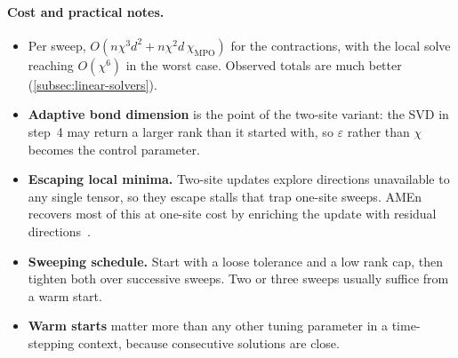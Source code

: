 \paragraph{Cost and practical notes.}
\begin{itemize}
  \item Per sweep, $O(n \chi^3 d^2 + n \chi^2 d\, \chi_{\mathrm{MPO}})$ for the
    contractions, with the local solve reaching $O(\chi^6)$ in the worst case.
    Observed totals are much better (\cref{subsec:linear-solvers}).
  \item \textbf{Adaptive bond dimension} is the point of the two-site variant:
    the SVD in step~4 may return a larger rank than it started with, so
    $\varepsilon$ rather than $\chi$ becomes the control parameter.
  \item \textbf{Escaping local minima.} Two-site updates explore directions
    unavailable to any single tensor, so they escape stalls that trap one-site
    sweeps. AMEn recovers most of this at one-site cost by enriching the update
    with residual directions~\cite{Dolgov2014,Holtz2012}.
  \item \textbf{Sweeping schedule.} Start with a loose tolerance and a low rank
    cap, then tighten both over successive sweeps. Two or three sweeps usually
    suffice from a warm start.
  \item \textbf{Warm starts} matter more than any other tuning parameter in a
    time-stepping context, because consecutive solutions are close.
\end{itemize}
